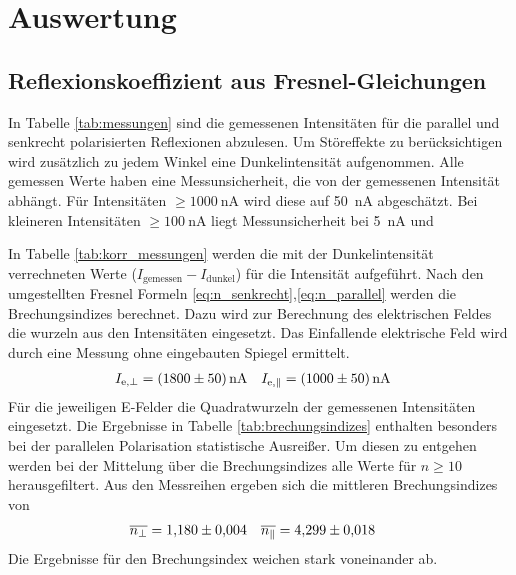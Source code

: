 \section{Auswertung}

\subsection{Reflexionskoeffizient aus Fresnel-Gleichungen}



In Tabelle \ref{tab:messungen} sind die gemessenen Intensitäten für die parallel 
und senkrecht polarisierten Reflexionen abzulesen.
Um Störeffekte zu berücksichtigen wird zusätzlich zu jedem Winkel eine Dunkelintensität aufgenommen.
Alle gemessen Werte haben eine Messunsicherheit, die von der gemessenen Intensität abhängt.
Für Intensitäten $\geq \qty{1000}{\nano\ampere}$ wird diese auf \qty{50}{\nano\ampere} abgeschätzt.
Bei kleineren Intensitäten $\geq \qty{100}{\nano\ampere}$ liegt Messunsicherheit bei \qty{5}{\nano\ampere} und 

In Tabelle \ref{tab:korr_messungen} werden die mit der Dunkelintensität verrechneten Werte ($I_\text{gemessen} - I_\text{dunkel}$)
für die Intensität aufgeführt.
Nach den umgestellten Fresnel Formeln \eqref{eq:n_senkrecht},\eqref{eq:n_parallel} werden die Brechungsindizes berechnet.
Dazu wird zur Berechnung des elektrischen Feldes die wurzeln aus den Intensitäten eingesetzt.
Das Einfallende elektrische Feld wird durch eine Messung ohne eingebauten Spiegel ermittelt.
\begin{align}
    I_{\text{e},\perp} &= \qty{1800 \pm 50}{\nano\ampere} & I_{\text{e},\parallel} &= \qty{1000 \pm 50}{\nano\ampere}
\end{align} 
Für die jeweiligen E-Felder die Quadratwurzeln der gemessenen Intensitäten eingesetzt.
Die Ergebnisse in Tabelle \ref{tab:brechungsindizes} enthalten besonders bei der 
parallelen Polarisation statistische Ausreißer. 
Um diesen zu entgehen werden bei der Mittelung über die Brechungsindizes alle Werte für $n \geq 10$ herausgefiltert.
Aus den Messreihen ergeben sich die mittleren Brechungsindizes von 
\begin{align}
    \overline{n_\perp} &= \num{1.180 \pm 0.004} & \overline{n_\parallel} &= \num{4.299 \pm 0.018}
\end{align}
Die Ergebnisse für den Brechungsindex weichen stark voneinander ab.